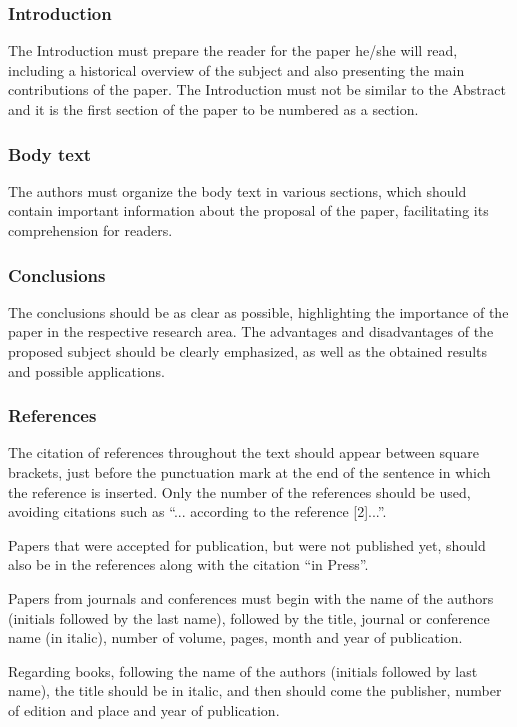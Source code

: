 \documentclass[english]{sobraep}
\begin{document}
\subsubsection{Introduction}

The Introduction must prepare the reader for the paper he/she will read, including a historical overview of the subject and also presenting the main contributions of the paper. The Introduction must not be similar to the Abstract and it is the first section of the paper to be numbered as a section.

\subsubsection{Body text}

The authors must organize the body text in various sections, which should contain important information about the proposal of the paper, facilitating its comprehension for readers.

\subsubsection{Conclusions}

The conclusions should be as clear as possible, highlighting the importance of the paper in the respective research area. The advantages and disadvantages of the proposed subject should be clearly emphasized, as well as the obtained results and possible applications.

\subsubsection{References}

The citation of references throughout the text should appear between square brackets, just before the punctuation mark at the end of the sentence in which the reference is inserted. Only the number of the references should be used, avoiding citations such as ``... according to the reference [2]...''.

Papers that were accepted for publication, but were not published yet, should also be in the references along with the citation ``in Press''.

Papers from journals and conferences must begin with the name of the authors (initials followed by the last name), followed by the title, journal or conference name (in italic), number of volume, pages, month and year of publication.

Regarding books, following the name of the authors (initials followed by last name), the title should be in italic, and then should come the publisher, number of edition and place and year of publication.
\end{document}
